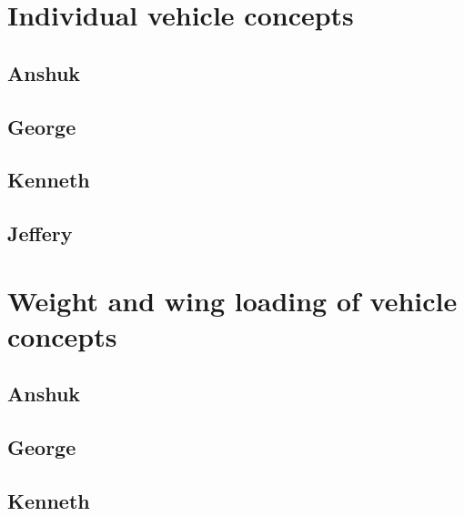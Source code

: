 \section{Individual vehicle concepts}

    \subsection{Anshuk}
    \subsection{George}
    \subsection{Kenneth}
    \subsection{Jeffery}

\section{Weight and wing loading of vehicle concepts}

    \subsection{Anshuk}
    \subsection{George}
    \subsection{Kenneth}
